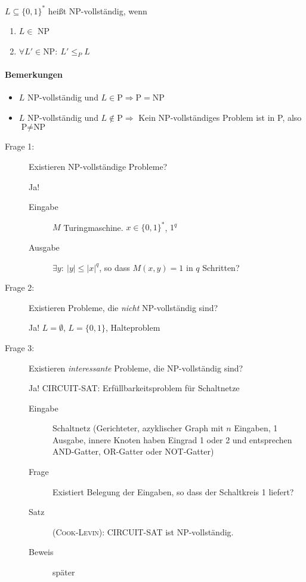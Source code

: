 \Defi $L \subseteq \{0,1\}^*$ heißt NP-vollständig, wenn
\renewcommand{\labelenumi}{(\theenumi)}
\renewcommand{\theenumi}{\roman{enumi}}
\begin{enumerate}
 \item $L \in$ NP
 \item $\forall L' \in \text{NP}{:}\ L' \leq_P L$
\end{enumerate}
\paragraph*{Bemerkungen}
\begin{itemize}
 \item $L$ NP-vollständig und $L \in \text{P} \Rightarrow \text{P} = \text{NP}$
 \item $L$ NP-vollständig und $L \notin \text{P} \Rightarrow$ Kein NP-vollständiges Problem ist in P, also $\text{P} \neq \text{NP}$
\end{itemize}
\begin{description}
 \item[Frage 1:] Existieren NP-vollständige Probleme?
 \par Ja!
 \begin{description}
  \item[Eingabe] $M$ Turingmaschine. $x \in \{0,1\}^*$, $1^q$
  \item[Ausgabe] $\exists y{:}\ |y| \leq |x|^q$, so dass $M(x,y) = 1$ in $q$ Schritten?
 \end{description}
 \item[Frage 2:] Existieren Probleme, die \emph{nicht} NP-vollständig sind?
 \par Ja! $L = \emptyset$, $L = \{0,1\}$, Halteproblem
 \item[Frage 3:] Existieren \emph{interessante} Probleme, die NP-vollständig sind?
 \par Ja! CIRCUIT-SAT: Erfüllbarkeitsproblem für Schaltnetze
     \begin{description}
      \item[Eingabe] Schaltnetz (Gerichteter, azyklischer Graph mit $n$ Eingaben, 1 Ausgabe, innere Knoten haben Eingrad 1 oder 2 und entsprechen AND-Gatter, OR-Gatter oder NOT-Gatter)
      \item[Frage] Existiert Belegung der Eingaben, so dass der Schaltkreis 1 liefert?
      \item[Satz] (\textsc{Cook}-\textsc{Levin}): CIRCUIT-SAT ist NP-vollständig.
      \item[Beweis] später
     \end{description}
\end{description}
